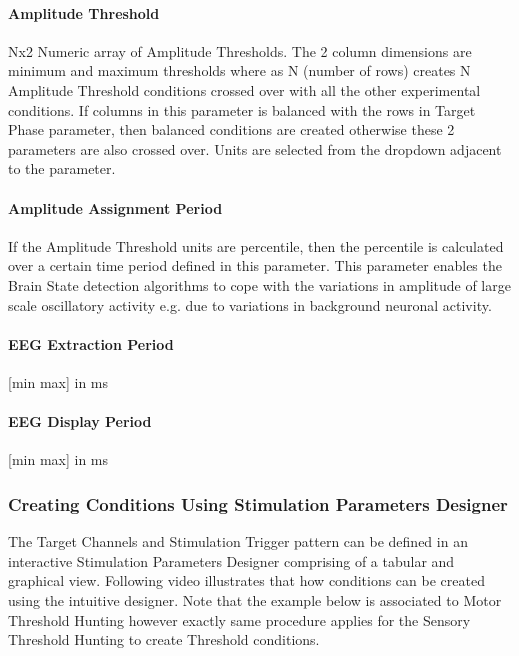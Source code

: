 \documentclass[letterpaper,10pt,english]{sphinxmanual}
\begin{document}
\paragraph{Amplitude Threshold}
\label{\detokenize{15_SensoryThresholdHunting:amplitude-threshold}}
\sphinxAtStartPar
Nx2 Numeric array of Amplitude Thresholds. The 2 column dimensions are minimum and maximum thresholds where as N (number of rows) creates N Amplitude Threshold conditions crossed over with all the other experimental conditions. If columns in this parameter is balanced with the rows in Target Phase parameter, then balanced conditions are created otherwise these 2 parameters are also crossed over. Units are selected from the drop\sphinxhyphen{}down adjacent to the parameter.


\paragraph{Amplitude Assignment Period}
\label{\detokenize{15_SensoryThresholdHunting:amplitude-assignment-period}}
\sphinxAtStartPar
If the Amplitude Threshold units are percentile, then the percentile is calculated over a certain time period defined in this parameter. This parameter enables the Brain State detection algorithms to cope with the variations in amplitude of large scale oscillatory activity e.g. due to variations in background neuronal activity.


\paragraph{EEG Extraction Period}
\label{\detokenize{15_SensoryThresholdHunting:eeg-extraction-period}}
\sphinxAtStartPar
{[}min max{]} in ms


\paragraph{EEG Display Period}
\label{\detokenize{15_SensoryThresholdHunting:eeg-display-period}}
\sphinxAtStartPar
{[}min max{]} in ms


\subsubsection{Creating Conditions Using Stimulation Parameters Designer}
\label{\detokenize{15_SensoryThresholdHunting:creating-conditions-using-stimulation-parameters-designer}}
\sphinxAtStartPar
The Target Channels and Stimulation Trigger pattern can be defined in an interactive Stimulation Parameters Designer comprising of a tabular and graphical view. Following video illustrates that how conditions can be created using the intuitive designer. Note that the example below is associated to Motor Threshold Hunting however exactly same procedure applies for the Sensory Threshold Hunting to create Threshold conditions.
\end{document}
